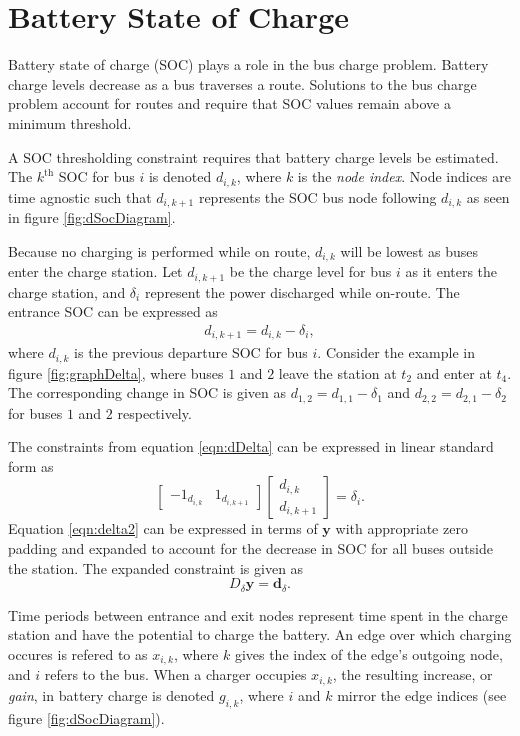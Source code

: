 \section{Battery State of Charge}
Battery state of charge (SOC) plays a role in the bus charge problem. Battery charge levels decrease as a bus traverses a route. Solutions to the bus charge problem account for routes and require that SOC values remain above a minimum threshold. 
\par A SOC thresholding constraint requires that battery charge levels be estimated. The $k^{\text{th}}$ SOC for bus $i$ is denoted $d_{i,k}$, where $k$ is the \textit{node index}. Node indices are time agnostic such that $d_{i,k+1}$ represents the SOC bus node following $d_{i,k}$ as seen in figure \ref{fig:dSocDiagram}. 
\par Because no charging is performed while on route, $d_{i,k}$ will be lowest as buses enter the charge station. Let $d_{i,k+1}$ be the charge level for bus $i$ as it enters the charge station, and $\delta_i$ represent the power discharged while on-route. The entrance SOC can be expressed as 
\begin{align}\label{eqn:dDelta}
	d_{i,k+1} = d_{i,k} - \delta_i,
\end{align}
where $d_{i,k}$ is the previous departure SOC for bus $i$. Consider the example in figure \ref{fig:graphDelta}, where buses $1$ and $2$ leave the station at $t_2$ and enter at $t_4$. The corresponding change in SOC is given as $d_{1,2} = d_{1,1} - \delta_1$ and $d_{2,2} = d_{2,1} - \delta_2$ for buses $1$ and $2$ respectively.

The constraints from equation \ref{eqn:dDelta} can be expressed in linear standard form as 
\begin{equation}\label{eqn:delta2}
	\begin{bmatrix}
		-1_{d_{i,k}} & 1_{d_{i,k+1}}
	\end{bmatrix}
	\begin{bmatrix}
		d_{i,k} \\ d_{i,k+1}
	\end{bmatrix} = \delta_i.
\end{equation}
Equation \ref{eqn:delta2} can be expressed in terms of $\mathbf{y}$ with appropriate zero padding and expanded to account for the decrease in SOC for all buses outside the station. The expanded constraint is given as 
\begin{equation}\label{eqn:deltaFinal}
	D_\delta\mathbf{y} = \mathbf{d}_\delta.
\end{equation}
\par Time periods between entrance and exit nodes represent time spent in the charge station and have the potential to charge the battery. An edge over which charging occures is refered to as $x_{i,k}$, where $k$ gives the index of the edge's outgoing node, and $i$ refers to the bus.  When a charger occupies $x_{i,k}$, the resulting increase, or \textit{gain}, in battery charge is denoted $g_{i,k}$, where $i$ and $k$ mirror the edge indices (see figure \ref{fig:dSocDiagram}). 

